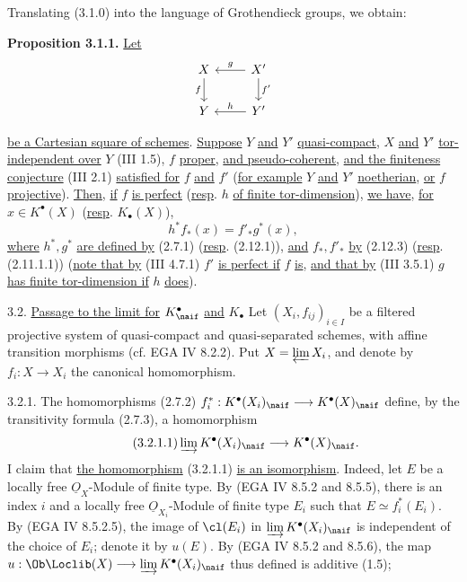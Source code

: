 Translating (3.1.0) into the language of Grothendieck groups, we obtain:

\textbf{Proposition 3.1.1.} \uline{Let}
\[
\begin{tikzcd}
X \arrow[d,"f"'] & X' \arrow[l,"g"']\arrow[d,"f'"]\\
Y & Y' \arrow[l,"h"']
\end{tikzcd}
\]

%
\uline{be a Cartesian square of schemes}. \uline{Suppose} \(Y\) \uline{and} \(Y'\) \uline{quasi-compact}, \(X\) \uline{and} \(Y'\) \uline{tor-independent over} \(Y\) (III 1.5), \(f\) \uline{proper}, \uline{and pseudo-coherent}, \uline{and the finiteness conjecture} (III 2.1) \uline{satisfied for} \(f\) \uline{and} \(f'\) (\uline{for example} \(Y\) \uline{and} \(Y'\) \uline{noetherian}, \uline{or} \(f\) \uline{projective}). \uline{Then}, \uline{if} \(f\) \uline{is perfect} (\uline{resp}. \(h\) \uline{of finite tor-dimension}), \uline{we have}, \uline{for} \(x\in K^{\bullet}(X)\) (\uline{resp}. \(K_{\bullet}(X)\)),
\[
 h^* f_*(x)=f'_* g^*(x),
\]
\uline{where} \(h^*,g^*\) \uline{are defined by} (2.7.1) (\uline{resp}. (2.12.1)), \uline{and} \(f_*,f'_*\) \uline{by} (2.12.3) (\uline{resp}. (2.11.1.1)) (\uline{note that by} (III 4.7.1) \(f'\) \uline{is perfect if} \(f\) \uline{is}, \uline{and that by} (III 3.5.1) \(g\) \uline{has finite tor-dimension if} \(h\) \uline{does}).

3.2. \uline{Passage to the limit for} \(K^{\bullet}_{\naif}\) \uline{and} \(K_{\bullet}\) Let \((X_i,f_{ij})_{i\in I}\) be a filtered projective system of quasi-compact and quasi-separated schemes, with affine transition morphisms (cf. EGA IV 8.2.2). Put \(X=\varprojlim X_i\), and denote by \(f_i:X\to X_i\) the canonical homomorphism.

3.2.1. The homomorphisms (2.7.2) \(f_i^*:K^{\bullet}(X_i)_{\naif}\longrightarrow K^{\bullet}(X)_{\naif}\) define, by the transitivity formula (2.7.3), a homomorphism
\begin{equation}\tag{3.2.1.1}
 \varinjlim K^{\bullet}(X_i)_{\naif}\longrightarrow K^{\bullet}(X)_{\naif}.
\end{equation}
I claim that \uline{the homomorphism} (3.2.1.1) \uline{is an isomorphism}. Indeed, let \(E\) be a locally free \(\underline O_X\)-Module of finite type. By (EGA IV 8.5.2 and 8.5.5), there is an index \(i\) and a locally free \(\underline O_{X_i}\)-Module of finite type \(E_i\) such that \(E\simeq f_i^*(E_i)\). By (EGA IV 8.5.2.5), the image of \(\cl(E_i)\) in \(\varinjlim K^{\bullet}(X_i)_{\naif}\) is independent of the choice of \(E_i\); denote it by \(u(E)\). By (EGA IV 8.5.2 and 8.5.6), the map
\(u:\Ob\Loclib(X)\longrightarrow \varinjlim K^{\bullet}(X_i)_{\naif}\) thus defined is additive (1.5);

